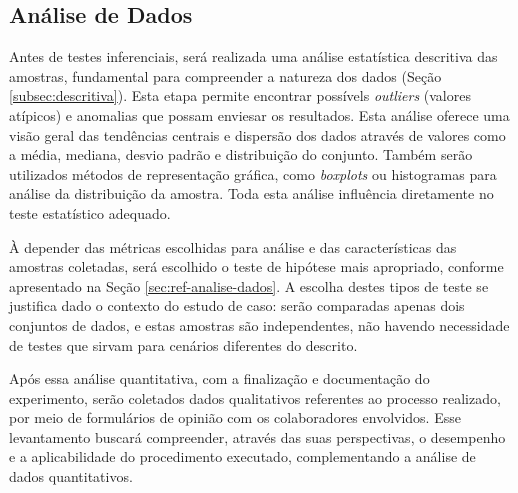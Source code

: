 \subsection{Análise de Dados}


Antes de testes inferenciais, será realizada uma análise estatística descritiva das amostras, fundamental para compreender a natureza dos dados (Seção \ref{subsec:descritiva}). Esta etapa permite encontrar possívels \textit{outliers} (valores atípicos) e anomalias que possam enviesar os resultados. Esta análise oferece uma visão geral das tendências centrais e dispersão dos dados através de valores como a média, mediana, desvio padrão e distribuição do conjunto. Também serão utilizados métodos de representação gráfica, como \textit{boxplots} ou histogramas para análise da distribuição da amostra. Toda esta análise influência diretamente no teste estatístico adequado.



À depender das métricas escolhidas para análise e das características das amostras coletadas, será escolhido o teste de hipótese mais apropriado, conforme apresentado na Seção \ref{sec:ref-analise-dados}. A escolha destes tipos de teste se justifica dado o contexto do estudo de caso: serão comparadas apenas dois conjuntos de dados, e estas amostras são independentes, não havendo necessidade de testes que sirvam para cenários diferentes do descrito. 

Após essa análise quantitativa, com a finalização e documentação do experimento, serão coletados dados qualitativos referentes ao processo realizado, por meio de formulários de opinião com os colaboradores envolvidos. Esse levantamento buscará compreender, através das suas perspectivas, o desempenho e a aplicabilidade do procedimento executado, complementando a análise de dados quantitativos.
